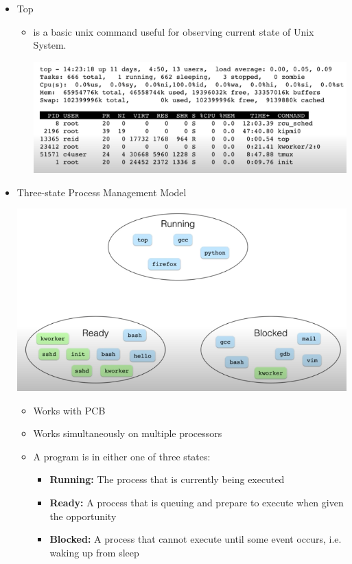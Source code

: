 \documentclass[12pt]{article}
\begin{document}
\begin{itemize}
\begin{itemize}
\begin{itemize}
        \end{itemize}

        \item Top

        \begin{itemize}
            \item is a basic unix command useful for observing current state of
            Unix System.

            \begin{center}
            \includegraphics[width=\linewidth]{images/week_8_notes_1_2.png}
            \end{center}
        \end{itemize}

        \item Three-state Process Management Model
        \begin{center}
        \includegraphics[width=0.8\linewidth]{images/week_8_notes_1_4.png}
        \end{center}

        \begin{itemize}
            \item Works with PCB
            \item Works simultaneously on multiple processors
            \item A program is in either one of three states:
            \begin{itemize}
                \item \textbf{Running:} The process that is currently being executed
                \item \textbf{Ready:} A process that is queuing and prepare to execute when given the opportunity
                \item \textbf{Blocked:} A process that cannot execute until some event occurs,
                i.e. waking up from sleep
            \end{itemize}
        \end{itemize}
    \end{itemize}
\end{itemize}
\end{document}

